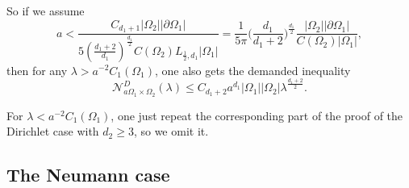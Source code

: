 \documentclass[11pt,letterpaper]{amsart}
\numberwithin{equation}{section}
\theoremstyle{plain}
\theoremstyle{plain}
\numberwithin{equation}{section}
\theoremstyle{remark}
\begin{document}
	So if we assume 
	\[
	a< \frac{C_{d_1+1} |\Omega_2|  |\partial \Omega_1|}{5(\frac{d_1+2}{d_1})^{\frac{d_1}{2}} C(\Omega_2) L_{\frac{1}{2}, d_1}|\Omega_1|} =\frac{1}{5\pi}\big(\frac {d_1}{d_1+2}\big)^{\frac{d_1}2}\frac{|\Omega_2||\partial \Omega_1|}{C(\Omega_2)|\Omega_1|}, 
	\]
	then for any $\lambda> a^{-2}C_1(\Omega_1)$, one also gets the demanded inequality
	\[
	\mathcal N^D_{a\Omega_1 \times \Omega_2}(\lambda)\le C_{d_1+2} a^{d_1} |\Omega_1||\Omega_2|\lambda^{\frac{d_1+2}{2}}.
	\]
	
	For  $\lambda< a^{-2}C_1(\Omega_1)$, one just repeat the corresponding part of the  proof of the Dirichlet case with $d_2\ge 3$, so we omit it. 
	
	\subsection{The Neumann case}	\label{Neu3}
	
\end{document}
